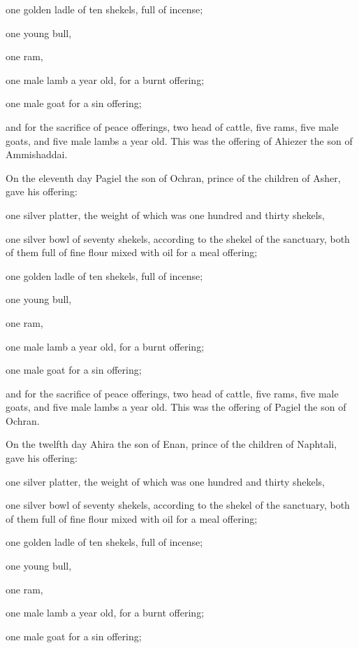  one golden ladle of ten shekels, full of incense;

 one young bull,

one ram,

one male lamb a year old, for a burnt offering;

 one male goat for a sin offering;

 and for the sacrifice of peace offerings, two head of
cattle, five rams, five male goats, and five male lambs a year old. This
was the offering of Ahiezer the son of Ammishaddai.

 On the eleventh day Pagiel the son of Ochran, prince of
the children of Asher,  gave his offering:

one silver platter, the weight of which was one hundred and thirty
shekels,

one silver bowl of seventy shekels, according to the shekel of the
sanctuary, both of them full of fine flour mixed with oil for a meal
offering;

 one golden ladle of ten shekels, full of incense;

 one young bull,

one ram,

one male lamb a year old, for a burnt offering;

 one male goat for a sin offering;

 and for the sacrifice of peace offerings, two head of
cattle, five rams, five male goats, and five male lambs a year old. This
was the offering of Pagiel the son of Ochran.

 On the twelfth day Ahira the son of Enan, prince of the
children of Naphtali,  gave his offering:

one silver platter, the weight of which was one hundred and thirty
shekels,

one silver bowl of seventy shekels, according to the shekel of the
sanctuary, both of them full of fine flour mixed with oil for a meal
offering;

 one golden ladle of ten shekels, full of incense;

 one young bull,

one ram,

one male lamb a year old, for a burnt offering;

 one male goat for a sin offering;

